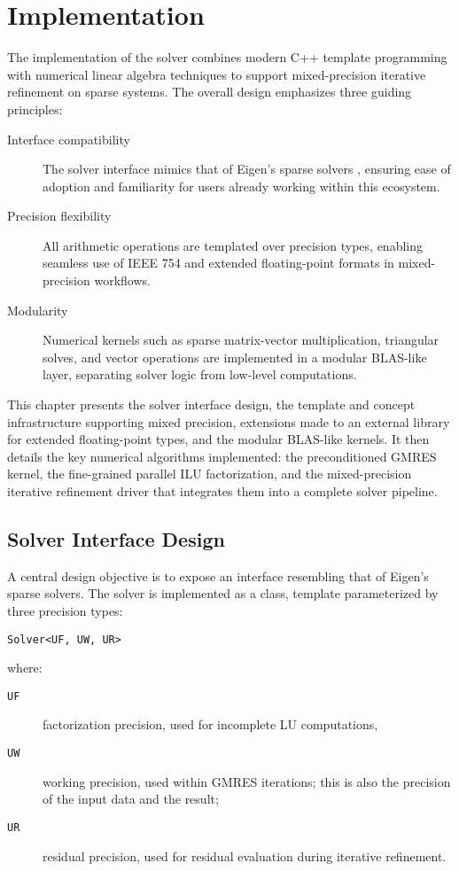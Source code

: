 \chapter{Implementation}
\label{cha:implementation}

The implementation of the solver combines modern C++ template programming with
numerical linear algebra techniques to support mixed-precision iterative
refinement on sparse systems. The overall design emphasizes three guiding
principles:

\begin{description}
\item[Interface compatibility] The solver interface mimics that of Eigen’s sparse
  solvers \cite{noauthor_eigen_nodate}, ensuring ease of adoption and
  familiarity for users already working within this ecosystem.
\item[Precision flexibility] All arithmetic operations are templated over precision
  types, enabling seamless use of IEEE 754 and extended floating-point formats
  in mixed-precision workflows.
\item[Modularity] Numerical kernels such as sparse matrix-vector multiplication,
  triangular solves, and vector operations are implemented in a modular
  BLAS-like layer, separating solver logic from low-level computations.
\end{description}

This chapter presents the solver interface design, the template and concept
infrastructure supporting mixed precision, extensions made to an external
library for extended floating-point types, and the modular BLAS-like kernels. It
then details the key numerical algorithms implemented: the preconditioned GMRES
kernel, the fine-grained parallel ILU factorization, and the mixed-precision
iterative refinement driver that integrates them into a complete solver
pipeline.

\section{Solver Interface Design}
\label{sec:solv-inetrf-design}

A central design objective is to expose an interface resembling that of Eigen's
sparse solvers. The solver is implemented as a class, template parameterized by
three precision types:
\begin{center}
  \texttt{Solver<UF, UW, UR>}
\end{center}
where:
\begin{description}
\item[\texttt{UF}] factorization precision, used for incomplete LU computations,
\item[\texttt{UW}] working precision, used within GMRES iterations; this is also the
  precision of the input data and the result;
\item[\texttt{UR}] residual precision, used for residual evaluation during iterative
  refinement.
\end{description}

